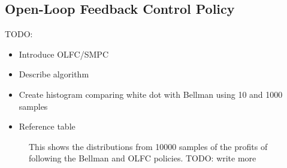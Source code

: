 \documentclass[main.tex]{subfiles}
\begin{document}
\subsection{Open-Loop Feedback Control Policy}
TODO:
\begin{itemize}
\item Introduce OLFC/SMPC
\item Describe algorithm
\item Create histogram comparing white dot with Bellman using 10 and 1000 samples
\item Reference table
\end{itemize}

\begin{figure}[htbp]
  \centering
  \caption{This shows the distributions from \num{10000} samples of
    the profits of following the Bellman and OLFC policies.
    TODO: write more
  }\label{fig:bellman_olfc_vals}
\end{figure}
\end{document}
